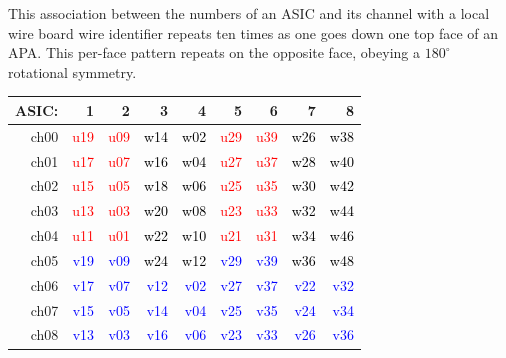 \documentclass[pdftex,12pt,letter]{article}
\begin{document}
This association between the numbers of an ASIC and its channel with a
local wire board wire identifier repeats ten times as one goes down
one top face of an APA.  This per-face pattern repeats on the opposite
face, obeying a $180^\circ$ rotational symmetry.

\begin{table}[htp]
  \label{tab:wirechmap}
  \centering

\begin{tabular}{r|rrrrrrrr}
\hline
ASIC:&1&2&3&4&5&6&7&8\\
\hline
ch00 & \textcolor{red}{u19} & \textcolor{red}{u09} & \textcolor{black}{w14} & \textcolor{black}{w02} & \textcolor{red}{u29} & \textcolor{red}{u39} & \textcolor{black}{w26} & \textcolor{black}{w38}\\
ch01 & \textcolor{red}{u17} & \textcolor{red}{u07} & \textcolor{black}{w16} & \textcolor{black}{w04} & \textcolor{red}{u27} & \textcolor{red}{u37} & \textcolor{black}{w28} & \textcolor{black}{w40}\\
ch02 & \textcolor{red}{u15} & \textcolor{red}{u05} & \textcolor{black}{w18} & \textcolor{black}{w06} & \textcolor{red}{u25} & \textcolor{red}{u35} & \textcolor{black}{w30} & \textcolor{black}{w42}\\
ch03 & \textcolor{red}{u13} & \textcolor{red}{u03} & \textcolor{black}{w20} & \textcolor{black}{w08} & \textcolor{red}{u23} & \textcolor{red}{u33} & \textcolor{black}{w32} & \textcolor{black}{w44}\\
ch04 & \textcolor{red}{u11} & \textcolor{red}{u01} & \textcolor{black}{w22} & \textcolor{black}{w10} & \textcolor{red}{u21} & \textcolor{red}{u31} & \textcolor{black}{w34} & \textcolor{black}{w46}\\
ch05 & \textcolor{blue}{v19} & \textcolor{blue}{v09} & \textcolor{black}{w24} & \textcolor{black}{w12} & \textcolor{blue}{v29} & \textcolor{blue}{v39} & \textcolor{black}{w36} & \textcolor{black}{w48}\\
ch06 & \textcolor{blue}{v17} & \textcolor{blue}{v07} & \textcolor{blue}{v12} & \textcolor{blue}{v02} & \textcolor{blue}{v27} & \textcolor{blue}{v37} & \textcolor{blue}{v22} & \textcolor{blue}{v32}\\
ch07 & \textcolor{blue}{v15} & \textcolor{blue}{v05} & \textcolor{blue}{v14} & \textcolor{blue}{v04} & \textcolor{blue}{v25} & \textcolor{blue}{v35} & \textcolor{blue}{v24} & \textcolor{blue}{v34}\\
ch08 & \textcolor{blue}{v13} & \textcolor{blue}{v03} & \textcolor{blue}{v16} & \textcolor{blue}{v06} & \textcolor{blue}{v23} & \textcolor{blue}{v33} & \textcolor{blue}{v26} & \textcolor{blue}{v36}\\

\end{tabular}
\end{table}
\end{document}
